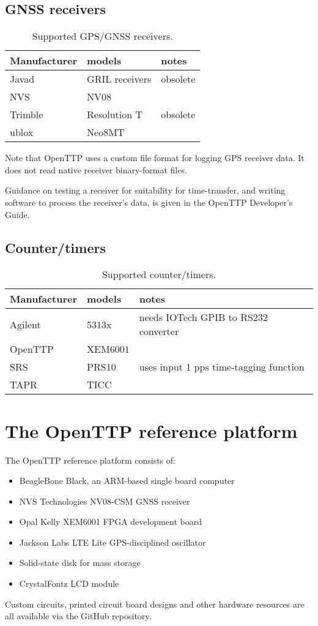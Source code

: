 	\subsection{GNSS receivers}
	
	\begin{table}[h]
	\begin{tabular}{lll}
	Manufacturer & models & notes \\ \hline
	Javad & GRIL receivers & obsolete \\
	NVS   & NV08 & \\
	Trimble & Resolution T & obsolete\\
	ublox & Neo8MT & \\
	\end{tabular}
	\caption{Supported GPS/GNSS receivers.}
	\end{table}
	
	Note that OpenTTP uses a custom file format for logging GPS receiver data. It does not read native receiver binary-format files.
	
	Guidance on testing a receiver for suitability for time-transfer, and writing software to process
	the receiver's data, is given in the OpenTTP Developer's Guide.
	
	\subsection{Counter/timers}
	
	\begin{table}[h]
	\begin{tabular}{lll}
	Manufacturer & models & notes \\ \hline
	Agilent & 5313x &  needs IOTech GPIB to RS232 converter\\
	OpenTTP & XEM6001 & \\
	SRS & PRS10 & uses input 1 pps time-tagging function\\
	TAPR & TICC &\\
	\end{tabular}
	\caption{Supported counter/timers.}
	\end{table}
	
\section{The OpenTTP reference platform}

The OpenTTP reference platform consists of:
\begin{itemize}
\item BeagleBone Black, an ARM-based single board computer
\item NVS Technologies NV08-CSM GNSS receiver
\item Opal Kelly XEM6001 FPGA development board
\item Jackson Labs LTE Lite GPS-disciplined oscillator
\item Solid-state disk for mass storage
\item CrystalFontz LCD module
\end{itemize}

Custom circuits, printed circuit board designs and other hardware resources are all available via the GitHub repository.